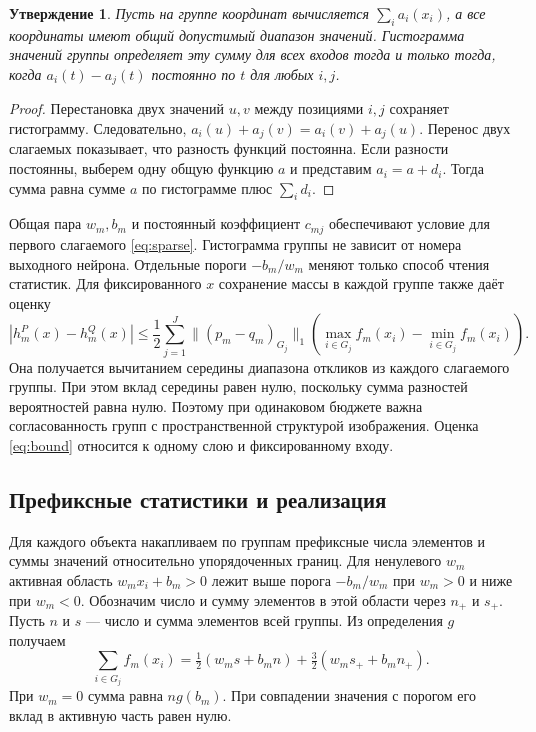 \documentclass[11pt,a4paper]{article}
\newtheorem{prop}{Утверждение}
\begin{document}
\begin{prop}
Пусть на группе координат вычисляется $\sum_i a_i(x_i)$, а все координаты имеют общий допустимый диапазон значений. Гистограмма значений группы определяет эту сумму для всех входов тогда и только тогда, когда $a_i(t)-a_j(t)$ постоянно по $t$ для любых $i,j$.
\end{prop}
\begin{proof}
Перестановка двух значений $u,v$ между позициями $i,j$ сохраняет гистограмму. Следовательно, $a_i(u)+a_j(v)=a_i(v)+a_j(u)$. Перенос двух слагаемых показывает, что разность функций постоянна. Если разности постоянны, выберем одну общую функцию $a$ и представим $a_i=a+d_i$. Тогда сумма равна сумме $a$ по гистограмме плюс $\sum_i d_i$.
\end{proof}

Общая пара $w_m,b_m$ и постоянный коэффициент $c_{mj}$ обеспечивают условие для первого слагаемого \eqref{eq:sparse}. Гистограмма группы не зависит от номера выходного нейрона. Отдельные пороги $-b_m/w_m$ меняют только способ чтения статистик. Для фиксированного $x$ сохранение массы в каждой группе также даёт оценку
\begin{equation}
 |h_m^P(x)-h_m^Q(x)|
 \le \frac12\sum_{j=1}^J
 \|(p_m-q_m)_{G_j}\|_1
 \left(\max_{i\in G_j} f_m(x_i)-\min_{i\in G_j} f_m(x_i)\right).
 \label{eq:bound}
\end{equation}
Она получается вычитанием середины диапазона откликов из каждого слагаемого группы. При этом вклад середины равен нулю, поскольку сумма разностей вероятностей равна нулю. Поэтому при одинаковом бюджете важна согласованность групп с пространственной структурой изображения. Оценка \eqref{eq:bound} относится к одному слою и фиксированному входу.

\subsection{Префиксные статистики и реализация}
Для каждого объекта накапливаем по группам префиксные числа элементов и суммы значений относительно упорядоченных границ. Для ненулевого $w_m$ активная область $w_m x_i+b_m>0$ лежит выше порога $-b_m/w_m$ при $w_m>0$ и ниже при $w_m<0$. Обозначим число и сумму элементов в этой области через $n_+$ и $s_+$. Пусть $n$ и $s$ — число и сумма элементов всей группы. Из определения $g$ получаем
\begin{equation}
 \sum_{i\in G_j} f_m(x_i)
 =\tfrac12(w_m s+b_m n)+\tfrac32(w_m s_++b_m n_+).
 \label{eq:moments}
\end{equation}
При $w_m=0$ сумма равна $n g(b_m)$. При совпадении значения с порогом его вклад в активную часть равен нулю.
\end{document}
